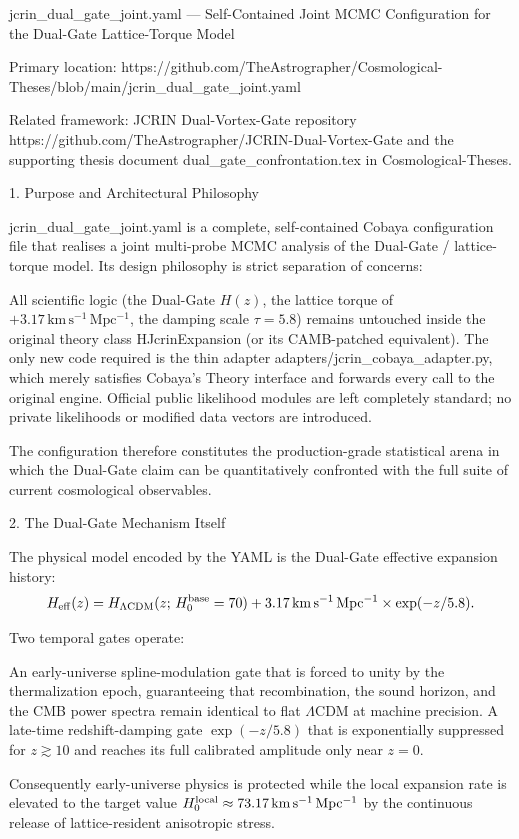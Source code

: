 jcrin_dual_gate_joint.yaml — Self-Contained Joint MCMC Configuration for the Dual-Gate Lattice-Torque Model

Primary location:  
https://github.com/TheAstrographer/Cosmological-Theses/blob/main/jcrin_dual_gate_joint.yaml  

Related framework: JCRIN Dual-Vortex-Gate repository  
https://github.com/TheAstrographer/JCRIN-Dual-Vortex-Gate  
and the supporting thesis document dual_gate_confrontation.tex in Cosmological-Theses.

1. Purpose and Architectural Philosophy

jcrin_dual_gate_joint.yaml is a complete, self-contained Cobaya configuration file that realises a joint multi-probe MCMC analysis of the Dual-Gate / lattice-torque model. Its design philosophy is strict separation of concerns:

All scientific logic (the Dual-Gate \(H(z)\), the lattice torque of \(+3.17\,\mathrm{km\,s^{-1}\,Mpc^{-1}}\), the damping scale \(\tau=5.8\)) remains untouched inside the original theory class HJcrinExpansion (or its CAMB-patched equivalent).
The only new code required is the thin adapter adapters/jcrin_cobaya_adapter.py, which merely satisfies Cobaya’s Theory interface and forwards every call to the original engine.
Official public likelihood modules are left completely standard; no private likelihoods or modified data vectors are introduced.

The configuration therefore constitutes the production-grade statistical arena in which the Dual-Gate claim can be quantitatively confronted with the full suite of current cosmological observables.

2. The Dual-Gate Mechanism Itself

The physical model encoded by the YAML is the Dual-Gate effective expansion history:
\[
H_{\rm eff}(z) = H_{\Lambda\mathrm{CDM}}(z;\,H_0^{\rm base}=70) + 3.17\,\mathrm{km\,s^{-1}\,Mpc^{-1}}\times\exp(-z/5.8).
\]

Two temporal gates operate:

An early-universe spline-modulation gate that is forced to unity by the thermalization epoch, guaranteeing that recombination, the sound horizon, and the CMB power spectra remain identical to flat \(\Lambda\)CDM at machine precision.
A late-time redshift-damping gate \(\exp(-z/5.8)\) that is exponentially suppressed for \(z\gtrsim 10\) and reaches its full calibrated amplitude only near \(z=0\).

Consequently early-universe physics is protected while the local expansion rate is elevated to the target value \(H_0^{\rm local}\approx 73.17\,\mathrm{km\,s^{-1}\,Mpc^{-1}}\) by the continuous release of lattice-resident anisotropic stress.

